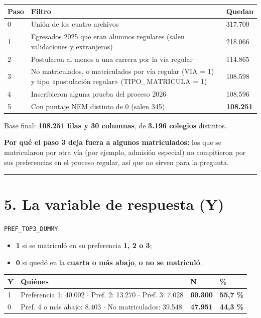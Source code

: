 \documentclass[11pt]{article}
\begin{document}
\begin{tabularx}{\linewidth}{lXl}\toprule
\textbf{Paso} & \textbf{Filtro} & \textbf{Quedan}\\ \midrule
0 & Unión de los cuatro archivos & 317.700\\
1 & Egresados 2025 que eran alumnos regulares (salen validaciones y extranjeros) & 218.066\\
2 & Postularon al menos a una carrera por la vía regular & 114.865\\
3 & No matriculados, o matriculados por vía regular (VIA = 1) y tipo «postulación regular» (TIPO\_MATRICULA = 1) & 108.598\\
4 & Inscribieron alguna prueba del proceso 2026 & 108.596\\
5 & Con puntaje NEM distinto de 0 (salen 345) & \textbf{108.251}\\
\bottomrule\end{tabularx}\medskip

Base final: \textbf{108.251 filas y 30 columnas}, de \textbf{3.196 colegios} distintos.\par

\textbf{Por qué el paso 3 deja fuera a algunos matriculados:} los que se matricularon por otra vía (por ejemplo, admisión especial) no compitieron por sus preferencias en el proceso regular, así que no sirven para la pregunta.\par

\medskip\hrule\medskip

\section*{5. La variable de respuesta (Y)}

\texttt{PREF\_TOP3\_DUMMY}:\par
\begin{itemize}
\item \textbf{1} si se matriculó en su preferencia \textbf{1, 2 o 3};
\item \textbf{0} si quedó en la \textbf{cuarta o más abajo}, \textbf{o no se matriculó}.
\end{itemize}

\begin{tabularx}{\linewidth}{lXll}\toprule
\textbf{Y} & \textbf{Quiénes} & \textbf{N} & \textbf{\%}\\ \midrule
1 & Preferencia 1: 40.002 $\cdot$ Pref. 2: 13.270 $\cdot$ Pref. 3: 7.028 & \textbf{60.300} & \textbf{55,7 \%}\\
0 & Pref. 4 o más abajo: 8.403 $\cdot$ No matriculados: 39.548 & \textbf{47.951} & \textbf{44,3 \%}\\
\bottomrule\end{tabularx}\medskip
\end{document}
